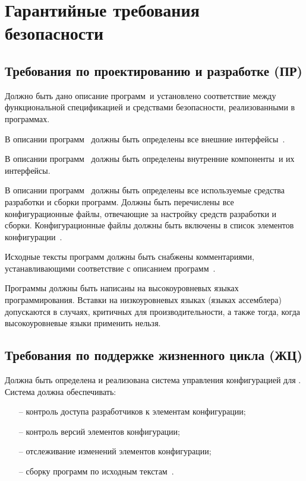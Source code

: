 \chapter{Гарантийные требования безопасности}\label{AReqs}

\section{Требования по проектированию и разработке (ПР)}

\label{ProgSpec}
Должно быть дано описание программ~\TOE и установлено соответствие 
между функциональной спецификацией и средствами безопасности,
реализованными в программах.

\label{HLD}
В описании программ~
должны быть определены все внешние интерфейсы~\TOE.

\label{LLD}
В описании программ~
должны быть определены внутренние компоненты~\TOE и их интерфейсы.

\label{Tools}
В описании программ~
должны быть определены все используемые средства разработки
и сборки программ. Должны быть перечислены все конфигурационные файлы,
отвечающие за настройку средств разработки и сборки. 
Конфигурационные файлы должны быть включены в список 
элементов конфигурации~.

\label{Comments}
Исходные тексты программ должны быть снабжены комментариями,
устанавливающими соответствие с описанием программ~.

\label{Language}
Программы должны быть написаны на высокоуровневых языках программирования.
Вставки на низкоуровневых языках (языках ассемблера)
допускаются в случаях, критичных для производительности, 
а также тогда, когда высокоуровневые языки применить нельзя.


\section{Требования по поддержке жизненного цикла (ЖЦ)}

\label{CMSystem}
Должна быть определена и реализована система управления конфигурацией для \TOE.
Система должна обеспечивать:
\begin{itemize}
\item[--]
контроль доступа разработчиков к элементам конфигурации;
\item[--]
контроль версий элементов конфигурации;
\item[--]
отслеживание изменений элементов конфигурации;
\item[--]
сборку программ по исходным текстам~.
\end{itemize}

